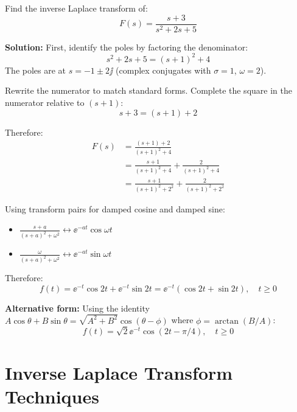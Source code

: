 \begin{examplebox}[title=Example: Partial Fraction Expansion with Complex Poles]
Find the inverse Laplace transform of:
\begin{equation}
F(s) = \frac{s + 3}{s^2 + 2s + 5}
\end{equation}

\textbf{Solution:}
First, identify the poles by factoring the denominator:
\begin{equation}
s^2 + 2s + 5 = (s+1)^2 + 4
\end{equation}
The poles are at $s = -1 \pm 2\jj$ (complex conjugates with $\sigma = 1$, $\omega = 2$).

Rewrite the numerator to match standard forms. Complete the square in the numerator relative to $(s+1)$:
\begin{equation}
s + 3 = (s + 1) + 2
\end{equation}

Therefore:
\begin{align}
F(s) &= \frac{(s+1) + 2}{(s+1)^2 + 4} \\
&= \frac{s+1}{(s+1)^2 + 4} + \frac{2}{(s+1)^2 + 4} \\
&= \frac{s+1}{(s+1)^2 + 2^2} + \frac{2}{(s+1)^2 + 2^2}
\end{align}

Using transform pairs for damped cosine and damped sine:
\begin{itemize}
    \item $\frac{s+a}{(s+a)^2+\omega^2} \leftrightarrow \ee^{-at}\cos\omega t$
    \item $\frac{\omega}{(s+a)^2+\omega^2} \leftrightarrow \ee^{-at}\sin\omega t$
\end{itemize}

Therefore:
\begin{equation}
\boxed{f(t) = \ee^{-t}\cos 2t + \ee^{-t}\sin 2t = \ee^{-t}(\cos 2t + \sin 2t), \quad t \geq 0}
\end{equation}

\textbf{Alternative form:} Using the identity $A\cos\theta + B\sin\theta = \sqrt{A^2+B^2}\cos(\theta - \phi)$ where $\phi = \arctan(B/A)$:
\begin{equation}
f(t) = \sqrt{2}\ee^{-t}\cos(2t - \pi/4), \quad t \geq 0
\end{equation}
\end{examplebox}

\section{Inverse Laplace Transform Techniques}

